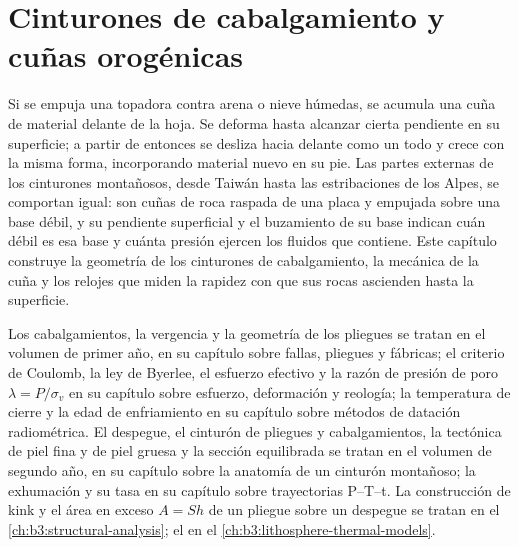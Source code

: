 \chapter{Cinturones de cabalgamiento y cuñas orogénicas}\label{ch:b3:orogenic-wedges}

Si se empuja una topadora contra arena o nieve húmedas, se acumula una cuña
de material delante de la hoja. Se deforma hasta alcanzar cierta pendiente
en su superficie; a partir de entonces se desliza hacia delante como un todo y crece
con la misma forma, incorporando material nuevo en su pie. Las partes externas de los
cinturones montañosos, desde Taiwán hasta las estribaciones de los Alpes, se comportan igual:
son cuñas de roca raspada de una placa y empujada sobre una base débil, y su pendiente
superficial y el buzamiento de su base indican cuán débil es esa base y cuánta
presión ejercen los fluidos que contiene. Este capítulo construye la geometría de los
cinturones de cabalgamiento, la mecánica de la cuña y los relojes que miden la rapidez
con que sus rocas ascienden hasta la superficie.

\begin{recall}
Los cabalgamientos, la vergencia y la geometría de los pliegues se tratan en el volumen de primer año, en su capítulo
sobre fallas, pliegues y fábricas; el criterio de Coulomb, la ley de Byerlee, el
esfuerzo efectivo y la razón de presión de poro $\lambda = P/\sigma_v$ en su
capítulo sobre esfuerzo, deformación y reología; la temperatura de cierre y la edad de enfriamiento
en su capítulo sobre métodos de datación radiométrica. El despegue, el
cinturón de pliegues y cabalgamientos, la tectónica de piel fina y de piel gruesa y la
sección equilibrada se tratan en el volumen de segundo año, en su capítulo sobre la anatomía de un
cinturón montañoso; la exhumación y su tasa en su capítulo sobre trayectorias P--T--t. La
construcción de kink y el área en exceso $A = Sh$ de un pliegue sobre un despegue
se tratan en el \cref{ch:b3:structural-analysis}; el  en
el \cref{ch:b3:lithosphere-thermal-models}.
\end{recall}

